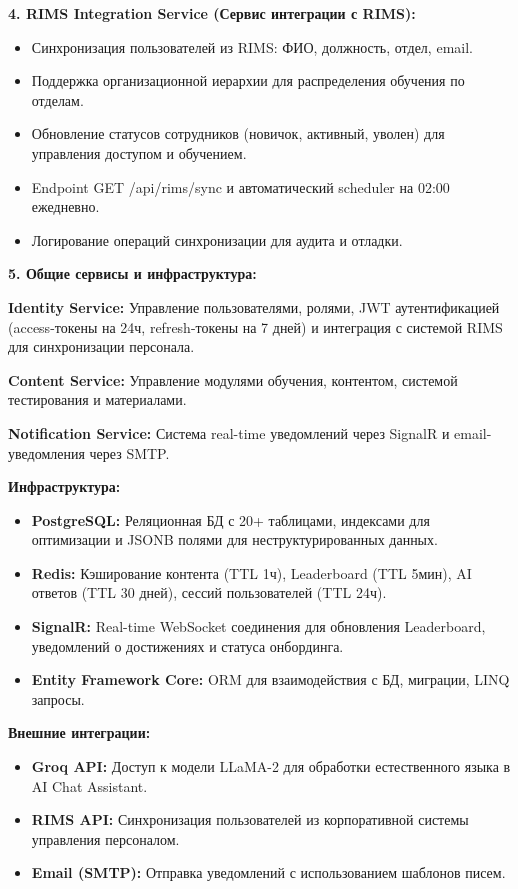 \textbf{4. RIMS Integration Service (Сервис интеграции с RIMS):}
\begin{itemize}
	\item Синхронизация пользователей из RIMS: ФИО, должность, отдел, email.
	\item Поддержка организационной иерархии для распределения обучения по отделам.
	\item Обновление статусов сотрудников (новичок, активный, уволен) для управления доступом и обучением.
	\item Endpoint GET /api/rims/sync и автоматический scheduler на 02:00 ежедневно.
	\item Логирование операций синхронизации для аудита и отладки.
\end{itemize}

\textbf{5. Общие сервисы и инфраструктура:}

\textbf{Identity Service:} Управление пользователями, ролями, JWT аутентификацией (access-токены на 24ч, refresh-токены на 7 дней) и интеграция с системой RIMS для синхронизации персонала.

\textbf{Content Service:} Управление модулями обучения, контентом, системой тестирования и материалами.

\textbf{Notification Service:} Система real-time уведомлений через SignalR и email-уведомления через SMTP.

\textbf{Инфраструктура:}
\begin{itemize}
	\item \textbf{PostgreSQL:} Реляционная БД с 20+ таблицами, индексами для оптимизации и JSONB полями для неструктурированных данных.
	\item \textbf{Redis:} Кэширование контента (TTL 1ч), Leaderboard (TTL 5мин), AI ответов (TTL 30 дней), сессий пользователей (TTL 24ч).
	\item \textbf{SignalR:} Real-time WebSocket соединения для обновления Leaderboard, уведомлений о достижениях и статуса онбординга.
	\item \textbf{Entity Framework Core:} ORM для взаимодействия с БД, миграции, LINQ запросы.
\end{itemize}

\textbf{Внешние интеграции:}
\begin{itemize}
	\item \textbf{Groq API:} Доступ к модели LLaMA-2 для обработки естественного языка в AI Chat Assistant.
	\item \textbf{RIMS API:} Синхронизация пользователей из корпоративной системы управления персоналом.
	\item \textbf{Email (SMTP):} Отправка уведомлений с использованием шаблонов писем.
\end{itemize}

